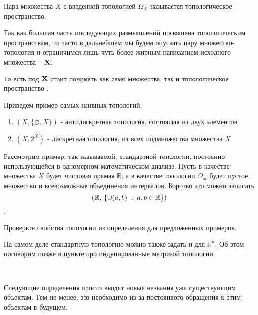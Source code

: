 \begin{Def}
    Пара \topX множества $X$ с введенной топологией $\Omega_X$ называется топологическое пространство.
\end{Def}
\begin{Note}
    Так как большая часть последующих размышлений посвящена топологическим пространствам, то часто в дальнейшем мы будем опускать пару множество-топология и ограничимся лишь чуть более жирным написанием исходного множества -- $\mathbf{X}$.

    То есть под $\mathbf{X}$ стоит понимать как само множества, так и топологическое пространство \topX.
\end{Note}

\begin{Ex}
    Приведем пример самых наивных топологий:
    \begin{enumerate}
        \item $(X, \{ \varnothing, X \})$ - антидискретная топология, состоящая из двух элементов
        \item $(X, 2^X)$ - дискретная топология, из всех подмножества множества $X$
    \end{enumerate}
\end{Ex}

\begin{Ex}
    Рассмотрим пример, так называемой, стандартной топологии, постоянно использующейся в одномерном  математическом анализе.
    Пусть в качестве множества  $X$ будет числовая прямая $\mathbb{R}$, а в качестве топологии $\Omega_{st}$ будет пустое множество и всевозможные объединения интервалов. 
    Коротко это можно записать $$\left( \mathbb{R}, \, \left\{ \cup(a,b) \; : \; a,b \in \mathbb{R} \right\} \right)$$.
\end{Ex}
\begin{Task}
    Проверьте свойства топологии из определения для предложенных примеров.
\end{Task}

На самом деле стандартную топологию можно также задать и для $\mathbb{R}^n$. Об этом поговорим позже в пункте про индуцированные метрикой топологии.

\

Следующие определения просто вводят новые названия уже существующим объектам. Тем не менее, это необходимо из-за постоянного обращения к этим объектам в будущем.

